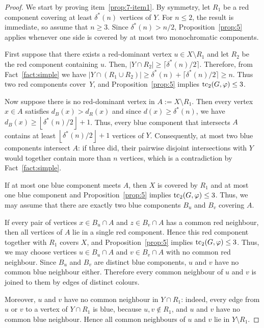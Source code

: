 \documentclass[12pt,reqno,a4paper]{amsart}
\def\tc{\mathop{\text{\rm tc}}\nolimits}
\begin{document}
\begin{proof}
We start by proving item~\ref{prop:7-item1}. By symmetry, let $R_1$ be a red component
covering at least $\delta^*(n)$ vertices of $Y$. For $n\le 2$, the result is
immediate, so assume that $n\ge 3$. Since $\delta^*(n)>n/2$,
Proposition~\ref{prop:5} applies whenever one side is covered by at most two
monochromatic components.

First suppose that there exists a red-dominant vertex $u \in X \setminus
R_1$ and let $R_2$ be the red component containing $u$. Then, $|Y\cap R_2| \ge
\lceil\delta^*(n)/2\rceil$. Therefore, from Fact~\ref{fact:simple} we have
$|Y\cap(R_1\cup R_2)|\ge\delta^*(n)+\lceil\delta^*(n)/2\rceil\ge n$.
Thus two red components cover~$Y$, and Proposition~\ref{prop:5} implies
$\tc_2(G,\varphi) \le 3$.

Now suppose there is no red-dominant vertex in $A:=X\setminus R_1$. Then
every vertex $x\in A$ satisfies $d_B(x)>d_R(x)$ and since $d(x)\ge \delta^*(n)$,
we have $d_B(x)\ge \left\lfloor \delta^*(n)/2\right\rfloor+1$. Thus, every
blue component that intersects $A$ contains at least
$\left\lfloor\delta^*(n)/2\right\rfloor+1$ vertices of $Y$. Consequently, at
most two blue components intersect $A$: if three did, their pairwise disjoint
intersections with $Y$ would together contain more than $n$ vertices, which is a contradiction by Fact~\ref{fact:simple}.

If at most one blue component meets $A$, then $X$ is covered by $R_1$ and at
most one blue component and Proposition~\ref{prop:5} implies
$\tc_2(G,\varphi)\le 3$. Thus, we may assume that there are exactly two blue
components $B_u$ and $B_v$ covering $A$.

If every pair of vertices $x\in B_u\cap A$ and $z\in B_v\cap A$ has a common red
neighbour, then all vertices of $A$ lie in a single red component. Hence this
red component together with $R_1$ covers $X$, and Proposition~\ref{prop:5}
implies $\tc_2(G,\varphi)\le 3$. Thus, we may choose vertices $u\in B_u\cap A$ and $v\in
B_v\cap A$ with no common red neighbour. Since $B_u$ and $B_v$ are distinct blue
components, $u$ and $v$ have no common blue neighbour either. Therefore every
common neighbour of $u$ and $v$ is joined to them by edges of distinct colours.

Moreover, $u$ and $v$ have no common neighbour in $Y\cap R_1$: indeed, every
edge from $u$ or $v$ to a vertex of $Y\cap R_1$ is blue, because
$u,v\notin R_1$, and $u$ and $v$ have no common blue neighbour. Hence all
common neighbours of $u$ and $v$ lie in $Y\setminus R_1$.


\end{proof}
\end{document}
